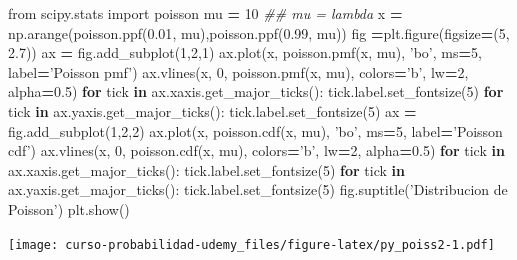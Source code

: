 \documentclass[]{book}
\newenvironment{Shaded}{\begin{snugshade}}{\end{snugshade}}
\newcommand{\CommentTok}[1]{\textcolor[rgb]{0.56,0.35,0.01}{\textit{#1}}}
\newcommand{\ControlFlowTok}[1]{\textcolor[rgb]{0.13,0.29,0.53}{\textbf{#1}}}
\newcommand{\DecValTok}[1]{\textcolor[rgb]{0.00,0.00,0.81}{#1}}
\newcommand{\FloatTok}[1]{\textcolor[rgb]{0.00,0.00,0.81}{#1}}
\newcommand{\ImportTok}[1]{#1}
\newcommand{\KeywordTok}[1]{\textcolor[rgb]{0.13,0.29,0.53}{\textbf{#1}}}
\newcommand{\NormalTok}[1]{#1}
\newcommand{\OperatorTok}[1]{\textcolor[rgb]{0.81,0.36,0.00}{\textbf{#1}}}
\newcommand{\StringTok}[1]{\textcolor[rgb]{0.31,0.60,0.02}{#1}}
\begin{document}
\begin{Shaded}
\begin{Highlighting}[]
\ImportTok{from}\NormalTok{ scipy.stats }\ImportTok{import}\NormalTok{ poisson}
\NormalTok{mu }\OperatorTok{=} \DecValTok{10} \CommentTok{## mu = lambda}
\NormalTok{x }\OperatorTok{=}\NormalTok{ np.arange(poisson.ppf(}\FloatTok{0.01}\NormalTok{, mu),poisson.ppf(}\FloatTok{0.99}\NormalTok{, mu))}
\NormalTok{fig }\OperatorTok{=}\NormalTok{plt.figure(figsize}\OperatorTok{=}\NormalTok{(}\DecValTok{5}\NormalTok{, }\FloatTok{2.7}\NormalTok{))}
\NormalTok{ax }\OperatorTok{=}\NormalTok{ fig.add_subplot(}\DecValTok{1}\NormalTok{,}\DecValTok{2}\NormalTok{,}\DecValTok{1}\NormalTok{)}
\NormalTok{ax.plot(x, poisson.pmf(x, mu), }\StringTok{'bo'}\NormalTok{, ms}\OperatorTok{=}\DecValTok{5}\NormalTok{, label}\OperatorTok{=}\StringTok{'Poisson pmf'}\NormalTok{)}
\NormalTok{ax.vlines(x, }\DecValTok{0}\NormalTok{, poisson.pmf(x, mu), colors}\OperatorTok{=}\StringTok{'b'}\NormalTok{, lw}\OperatorTok{=}\DecValTok{2}\NormalTok{, alpha}\OperatorTok{=}\FloatTok{0.5}\NormalTok{)}
\ControlFlowTok{for}\NormalTok{ tick }\KeywordTok{in}\NormalTok{ ax.xaxis.get_major_ticks():}
\NormalTok{  tick.label.set_fontsize(}\DecValTok{5}\NormalTok{)}
\ControlFlowTok{for}\NormalTok{ tick }\KeywordTok{in}\NormalTok{ ax.yaxis.get_major_ticks():}
\NormalTok{  tick.label.set_fontsize(}\DecValTok{5}\NormalTok{) }
\NormalTok{ax }\OperatorTok{=}\NormalTok{ fig.add_subplot(}\DecValTok{1}\NormalTok{,}\DecValTok{2}\NormalTok{,}\DecValTok{2}\NormalTok{)}
\NormalTok{ax.plot(x, poisson.cdf(x, mu), }\StringTok{'bo'}\NormalTok{, ms}\OperatorTok{=}\DecValTok{5}\NormalTok{, label}\OperatorTok{=}\StringTok{'Poisson cdf'}\NormalTok{)}
\NormalTok{ax.vlines(x, }\DecValTok{0}\NormalTok{, poisson.cdf(x, mu), colors}\OperatorTok{=}\StringTok{'b'}\NormalTok{, lw}\OperatorTok{=}\DecValTok{2}\NormalTok{, alpha}\OperatorTok{=}\FloatTok{0.5}\NormalTok{)}
\ControlFlowTok{for}\NormalTok{ tick }\KeywordTok{in}\NormalTok{ ax.xaxis.get_major_ticks():}
\NormalTok{  tick.label.set_fontsize(}\DecValTok{5}\NormalTok{)}
\ControlFlowTok{for}\NormalTok{ tick }\KeywordTok{in}\NormalTok{ ax.yaxis.get_major_ticks():}
\NormalTok{  tick.label.set_fontsize(}\DecValTok{5}\NormalTok{)}
\NormalTok{fig.suptitle(}\StringTok{'Distribucion de Poisson'}\NormalTok{)}
\NormalTok{plt.show()}
\end{Highlighting}
\end{Shaded}

\texttt{[image: curso-probabilidad-udemy\_files/figure-latex/py\_poiss2-1.pdf]}
\end{document}
